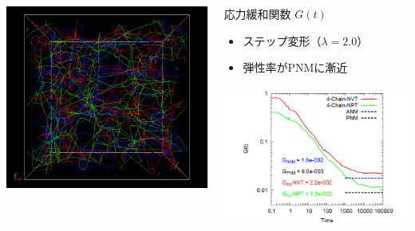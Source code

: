 \documentclass[12pt, dvipdfmx]{beamer}
\begin{document}
\begin{frame}
\begin{columns}[T, onlytextwidth]
\begin{itemize}
					\includegraphics[width=.62\textwidth]{N48_f4_PPA.png}
				\end{itemize}
			\begin{block}{応力緩和関数 $G(t)$}
				\begin{itemize}
					\item ステップ変形（$\lambda=2.0$）
					\item 弾性率がPNMに漸近
				\end{itemize}
					\includegraphics[width=\textwidth]{gt_4chain_comp.png}
				\end{block}
		\end{columns}
\end{frame}
\end{document}
